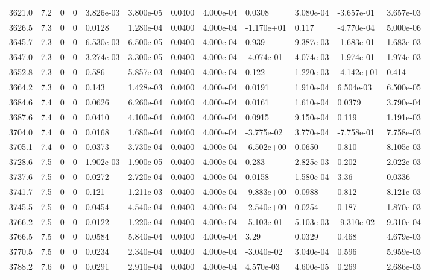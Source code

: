 \documentclass[preview]{standalone}
\begin{document}
{{{{{{{{{\begin{tabular}{L{1.2cm}C{1.2cm} C{0.3cm}C{0.5cm} C{1.4cm}C{1.4cm} C{1.4cm}C{1.4cm} C{1.6cm}C{1.6cm} C{1.6cm}C{1.6cm}}
  3621.0  &   7.2  & 0     &  0 &  3.826e-03  & 3.800e-05  &  0.0400&   4.000e-04& 0.0308 & 3.080e-04   &  -3.657e-01 & 3.657e-03  \\ 
  3626.5  &   7.3  & 0     &  0 &  0.0128  & 1.280e-04  &  0.0400&   4.000e-04& -1.170e+01 & 0.117   &  -4.770e-04 & 5.000e-06  \\ 
  3645.7  &   7.3  & 0     &  0 &  6.530e-03  & 6.500e-05  &  0.0400&   4.000e-04& 0.939 & 9.387e-03   &  -1.683e-01 & 1.683e-03  \\ 
  3647.0  &   7.3  & 0     &  0 &  3.274e-03  & 3.300e-05  &  0.0400&   4.000e-04& -4.074e-01 & 4.074e-03   &  -1.974e-01 & 1.974e-03  \\ 
  3652.8  &   7.3  & 0     &  0 &  0.586  & 5.857e-03  &  0.0400&   4.000e-04& 0.122 & 1.220e-03   &  -4.142e+01 & 0.414  \\ 
  3664.2  &   7.3  & 0     &  0 &  0.143  & 1.428e-03  &  0.0400&   4.000e-04& 0.0191 & 1.910e-04   &  6.504e-03 & 6.500e-05  \\ 
  3684.6  &   7.4  & 0     &  0 &  0.0626  & 6.260e-04  &  0.0400&   4.000e-04& 0.0161 & 1.610e-04   &  0.0379 & 3.790e-04  \\ 
  3687.6  &   7.4  & 0     &  0 &  0.0410  & 4.100e-04  &  0.0400&   4.000e-04& 0.0915 & 9.150e-04   &  0.119 & 1.191e-03  \\ 
  3704.0  &   7.4  & 0     &  0 &  0.0168  & 1.680e-04  &  0.0400&   4.000e-04& -3.775e-02 & 3.770e-04   &  -7.758e-01 & 7.758e-03  \\ 
  3705.1  &   7.4  & 0     &  0 &  0.0373  & 3.730e-04  &  0.0400&   4.000e-04& -6.502e+00 & 0.0650   &  0.810 & 8.105e-03  \\ 
  3728.6  &   7.5  & 0     &  0 &  1.902e-03  & 1.900e-05  &  0.0400&   4.000e-04& 0.283 & 2.825e-03   &  0.202 & 2.022e-03  \\ 
  3737.6  &   7.5  & 0     &  0 &  0.0272  & 2.720e-04  &  0.0400&   4.000e-04& 0.0158 & 1.580e-04   &  3.36 & 0.0336  \\ 
  3741.7  &   7.5  & 0     &  0 &  0.121  & 1.211e-03  &  0.0400&   4.000e-04& -9.883e+00 & 0.0988   &  0.812 & 8.121e-03  \\ 
  3745.5  &   7.5  & 0     &  0 &  0.0454  & 4.540e-04  &  0.0400&   4.000e-04& -2.540e+00 & 0.0254   &  0.187 & 1.870e-03  \\ 
  3766.2  &   7.5  & 0     &  0 &  0.0122  & 1.220e-04  &  0.0400&   4.000e-04& -5.103e-01 & 5.103e-03   &  -9.310e-02 & 9.310e-04  \\ 
  3766.5  &   7.5  & 0     &  0 &  0.0584  & 5.840e-04  &  0.0400&   4.000e-04& 3.29 & 0.0329   &  0.468 & 4.679e-03  \\ 
  3770.5  &   7.5  & 0     &  0 &  0.0234  & 2.340e-04  &  0.0400&   4.000e-04& -3.040e-02 & 3.040e-04   &  0.596 & 5.959e-03  \\ 
  3788.2  &   7.6  & 0     &  0 &  0.0291  & 2.910e-04  &  0.0400&   4.000e-04& 4.570e-03 & 4.600e-05   &  0.269 & 2.686e-03  \\ 
\hline 
\end{tabular} 

}}}}}}}}}
\end{document}
